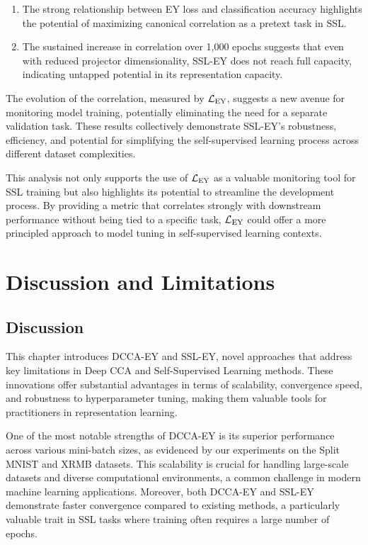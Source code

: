 \begin{enumerate}
    \item The strong relationship between EY loss and classification accuracy highlights the potential of maximizing canonical correlation as a pretext task in SSL.
    \item The sustained increase in correlation over 1,000 epochs suggests that even with reduced projector dimensionality, SSL-EY does not reach full capacity, indicating untapped potential in its representation capacity.
\end{enumerate}

The evolution of the correlation, measured by $\mathcal{L}_\text{EY}$, suggests a new avenue for monitoring model training, potentially eliminating the need for a separate validation task. These results collectively demonstrate SSL-EY's robustness, efficiency, and potential for simplifying the self-supervised learning process across different dataset complexities.

This analysis not only supports the use of $\mathcal{L}_\text{EY}$ as a valuable monitoring tool for SSL training but also highlights its potential to streamline the development process. By providing a metric that correlates strongly with downstream performance without being tied to a specific task, $\mathcal{L}_\text{EY}$ could offer a more principled approach to model tuning in self-supervised learning contexts.

\section{Discussion and Limitations}

\subsection{Discussion}

This chapter introduces DCCA-EY and SSL-EY, novel approaches that address key limitations in Deep CCA and Self-Supervised Learning methods. These innovations offer substantial advantages in terms of scalability, convergence speed, and robustness to hyperparameter tuning, making them valuable tools for practitioners in representation learning.

One of the most notable strengths of DCCA-EY is its superior performance across various mini-batch sizes, as evidenced by our experiments on the Split MNIST and XRMB datasets. This scalability is crucial for handling large-scale datasets and diverse computational environments, a common challenge in modern machine learning applications. Moreover, both DCCA-EY and SSL-EY demonstrate faster convergence compared to existing methods, a particularly valuable trait in SSL tasks where training often requires a large number of epochs.

